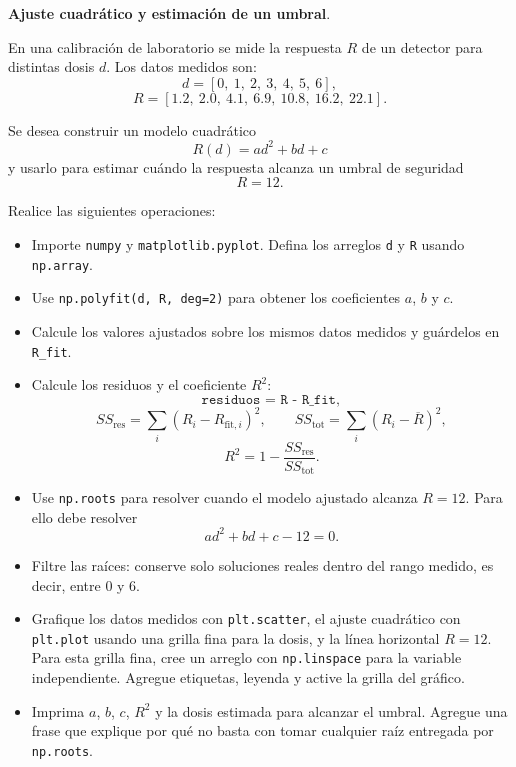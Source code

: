 \providecommand{\Needspace}[1]{}
\Needspace{8\baselineskip}
\item \textbf{Ajuste cuadrático y estimación de un umbral}.
\nopagebreak[4]

\begin{tcolorbox}[colback=blue!2!white,colframe=blue!55!black,title={Enunciado},
                  before skip=3pt,after skip=5pt,boxsep=3pt,top=3pt,bottom=3pt,
                  breakable]
\small
\raggedright
En una calibración de laboratorio se mide la respuesta \(R\) de un detector para
distintas dosis \(d\). Los datos medidos son:
\[
d = [0,\ 1,\ 2,\ 3,\ 4,\ 5,\ 6],
\]
\[
R = [1.2,\ 2.0,\ 4.1,\ 6.9,\ 10.8,\ 16.2,\ 22.1].
\]

Se desea construir un modelo cuadrático
\[
R(d)=ad^2+bd+c
\]
y usarlo para estimar cuándo la respuesta alcanza un umbral de seguridad
\[
R=12.
\]

Realice las siguientes operaciones:

\begin{itemize}
\setlength{\topsep}{4pt}
\setlength{\itemsep}{3pt}
\setlength{\parsep}{0pt}
\item[(a)] Importe \texttt{numpy} y \texttt{matplotlib.pyplot}. Defina los
arreglos \texttt{d} y \texttt{R} usando \texttt{np.array}.
\item[(b)] Use \texttt{np.polyfit(d, R, deg=2)} para obtener los coeficientes
\(a\), \(b\) y \(c\).
\item[(c)] Calcule los valores ajustados sobre los mismos datos medidos y
guárdelos en \texttt{R\_fit}.
\item[(d)] Calcule los residuos y el coeficiente \(R^2\):
\[
\texttt{residuos = R - R\_fit},
\]
\[
SS_{\mathrm{res}} = \sum_i \left(R_i - R_{\mathrm{fit},i}\right)^2,
\qquad
SS_{\mathrm{tot}} = \sum_i \left(R_i - \overline{R}\right)^2,
\]
\[
R^2 = 1 - \frac{SS_{\mathrm{res}}}{SS_{\mathrm{tot}}}.
\]
\item[(e)] Use \texttt{np.roots} para resolver cuando el modelo ajustado alcanza
\(R=12\). Para ello debe resolver
\[
ad^2+bd+c-12=0.
\]
\item[(f)] Filtre las raíces: conserve solo soluciones reales dentro del rango
medido, es decir, entre \(0\) y \(6\).
\item[(g)] Grafique los datos medidos con \texttt{plt.scatter}, el ajuste
cuadrático con \texttt{plt.plot} usando una grilla fina para la dosis, y la
línea horizontal \(R=12\). Para esta grilla fina, cree un arreglo con
\texttt{np.linspace} para la variable independiente. Agregue etiquetas, leyenda
y active la grilla del gráfico.
\item[(h)] Imprima \(a\), \(b\), \(c\), \(R^2\) y la dosis estimada para alcanzar
el umbral. Agregue una frase que explique por qué no basta con tomar cualquier
raíz entregada por \texttt{np.roots}.
\end{itemize}
\end{tcolorbox}

